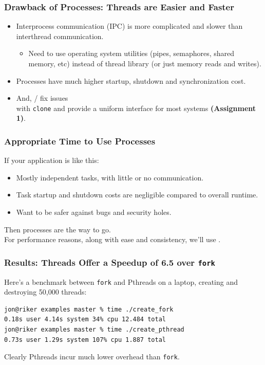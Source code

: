 \begin{frame}[fragile]
  \frametitle{Drawback of Processes: Threads are Easier and Faster}

  \begin{itemize}
    \item Interprocess communication (IPC) is more complicated and slower than interthread
          communication.
      \begin{itemize}
        \item Need to use operating system utilities (pipes, semaphores, shared
              memory, etc) instead of thread library (or just memory reads and writes).
      \end{itemize}
    \item Processes have much higher startup, shutdown and synchronization cost.
    \item And, / fix issues\\ with {\tt clone} and provide a
          uniform interface for most systems {\bf (Assignment 1)}.
  \end{itemize}

\end{frame}

\begin{frame}[fragile]
  \frametitle{Appropriate Time to Use Processes}


  If your application is like this:
  \begin{itemize}
    \item Mostly independent tasks, with little or no communication.
    \item Task startup and shutdown costs are negligible compared to overall runtime.
    \item Want to be safer against bugs and security holes.
  \end{itemize}
  Then processes are the way to go. \\[1em]

  For performance reasons, along with ease and consistency, we'll use
  .
  

\end{frame}

\begin{frame}[fragile]
  \frametitle{Results: Threads Offer a Speedup of 6.5 over {\tt fork}}


  Here's a benchmark between {\tt fork} and Pthreads on a laptop, creating and
  destroying 50,000 threads:
  \vfill
  \begin{lstlisting}[basicstyle=\scriptsize]
jon@riker examples master % time ./create_fork 
0.18s user 4.14s system 34% cpu 12.484 total
jon@riker examples master % time ./create_pthread 
0.73s user 1.29s system 107% cpu 1.887 total
  \end{lstlisting}
  \vfill
  Clearly Pthreads incur much lower overhead than {\tt fork}.
  
\end{frame}





